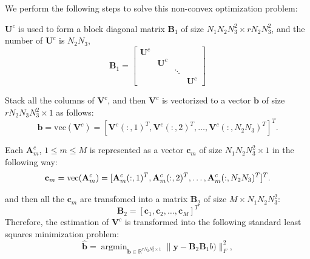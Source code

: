 \documentclass[journal,article,submit,moreauthors,pdftex,10pt,a4paper]{Definitions/mdpi}
\theoremstyle{plain}
\theoremstyle{definition}
\theoremstyle{remark}
\begin{document}
We perform the following steps to solve this non-convex optimization problem:
\begin{steps}
\item $\mathbf{U}^c$ is used to form a block diagonal matrix $\mathbf{B}_1$ of size $N_1N_2N^2_3 \times rN_2N^2_3$, and the number of $\mathbf{U}^c$ is $N_2N_3$,
    \begin{equation}
        \mathbf{B}_1 = 
        \begin{bmatrix}
            \mathbf{U}^c & & & \\
            & \mathbf{U}^c & & \\
            & & \ddots & \\
            & & & \mathbf{U}^c
        \end{bmatrix}
    \end{equation}
\item Stack all the columns of $\mathbf{V}^c$, and then $\mathbf{V}^c$ is vectorized to a vector $\mathbf{b}$ of size $rN_2N_3N^2_3 \times 1$ as follows:
    \begin{equation}
        \mathbf{b} = \text{vec}(\mathbf{V}^c) =[\mathbf{V}^c(:,1)^T, \mathbf{V}^c(:,2)^T, \dots, \mathbf{V}^c(:,N_2N_3)^T]^T. 
    \end{equation}

\item Each $\mathbf{A}^c_m$, $1 \leq m \leq M$ is represented as a vector $\mathbf{c}_m$ of size $N_1N_2N^2_3 \times 1$ in the following way:
    \begin{equation}
        \mathbf{c}_m = \text{vec}(\mathbf{A}^c_m) \\
        =[\mathbf{A}^c_m(:,1)^T, \mathbf{A}^c_m(:,2)^T, \dots, \mathbf{A}^c_m(:,N_2N_3)^T]^T.
    \end{equation}

    and then all the $\mathbf{c}_m$ are transfomed into a matrix $\mathbf{B}_2$ of size $M \times N_1N_2N^2_3$:
    \begin{equation}
        \mathbf{B}_2 = [\mathbf{c}_1, \mathbf{c}_2, \dots, \mathbf{c}_M]^T
    \end{equation}
    Therefore, the estimation of $\mathbf{V}^c$ is transformed into the following standard least squares minimization problem:
        \begin{equation}
            \widehat{\mathbf{b}} =
            \mathop{\arg\min}_{ \mathbf{b} \in \mathbb{R}^{rN_2N^2_3 \times 1}} \| \mathbf{y} - \mathbf{B}_2\mathbf{B}_1b) \|_F^2 ,
        \end{equation}

\end{steps}
\end{document}
